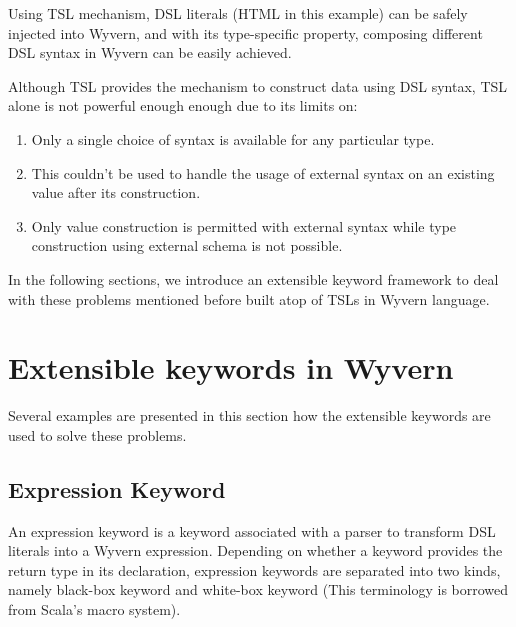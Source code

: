 \documentclass{sig-alternate}
\begin{document}
Using TSL mechanism, DSL literals (HTML in this example) can be safely injected into Wyvern, and with its type-specific property, composing different DSL syntax in Wyvern can be easily achieved. 

Although TSL provides the mechanism to construct data using DSL syntax, TSL alone is not powerful enough enough due to its limits on: 
\begin{enumerate}\setlength{\itemsep}{0pt}
\item Only a single choice of syntax is available for any particular type.
\item This couldn't be used to handle the usage of external syntax on an existing value after its construction.
\item Only value construction is permitted with external syntax while type construction using external schema is not possible.
\end{enumerate}

In the following sections, we introduce an extensible keyword framework to deal with these problems mentioned before built atop of TSLs in Wyvern language. 

\section{Extensible keywords in Wyvern}
Several examples are presented in this section how the extensible keywords are used to solve these problems.
\subsection{Expression Keyword}
An expression keyword is a keyword associated with a parser to transform DSL literals into a Wyvern expression. Depending on whether a keyword provides the return type in its declaration, expression keywords are separated into two kinds, namely black-box keyword and white-box keyword (This terminology is borrowed from Scala's macro system). 
\end{document}
